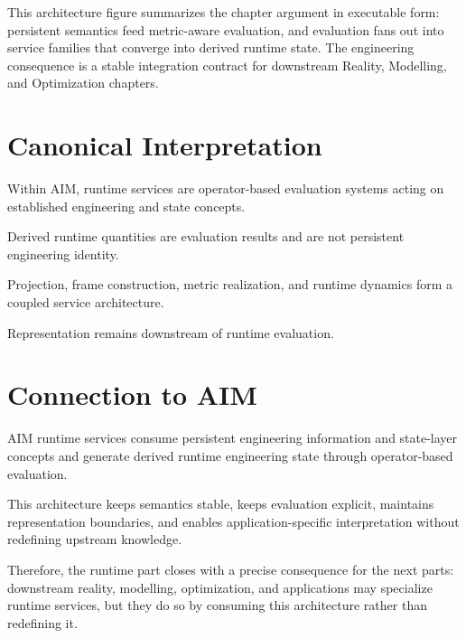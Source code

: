 This architecture figure summarizes the chapter argument in executable
form: persistent semantics feed metric-aware evaluation, and evaluation
fans out into service families that converge into derived runtime state.
The engineering consequence is a stable integration contract for
downstream Reality, Modelling, and Optimization chapters.

\section{Canonical Interpretation}

\begin{proposition}
Within AIM, runtime services are operator-based evaluation systems
acting on established engineering and state concepts.
\end{proposition}

\begin{proposition}
Derived runtime quantities are evaluation results and are not persistent
engineering identity.
\end{proposition}

\begin{proposition}
Projection, frame construction, metric realization, and runtime dynamics
form a coupled service architecture.
\end{proposition}

\begin{proposition}
Representation remains downstream of runtime evaluation.
\end{proposition}

\section{Connection to AIM}

\begin{summary}
AIM runtime services consume persistent engineering information and
state-layer concepts and generate derived runtime engineering state
through operator-based evaluation.

This architecture keeps semantics stable, keeps evaluation explicit,
maintains representation boundaries, and enables
application-specific interpretation without redefining upstream
knowledge.

Therefore, the runtime part closes with a precise consequence for the
next parts: downstream reality, modelling, optimization, and
applications may specialize runtime services, but they do so by
consuming this architecture rather than redefining it.
\end{summary}
